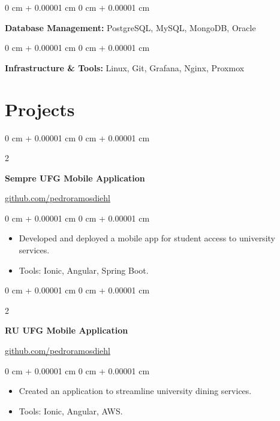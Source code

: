 \documentclass[10pt, letterpaper]{article}
\newenvironment{highlights}{
    \begin{itemize}[
        topsep=0.10 cm,
        parsep=0.10 cm,
        partopsep=0pt,
        itemsep=0pt,
        leftmargin=0 cm + 10pt
    ]
}{
    \end{itemize}
} %
\newenvironment{onecolentry}{
    \begin{adjustwidth}{
        0 cm + 0.00001 cm
    }{
        0 cm + 0.00001 cm
    }
}{
    \end{adjustwidth}
} %
\newenvironment{twocolentry}[2][]{
    \onecolentry
    \def\secondColumn{#2}
    \setcolumnwidth{\fill, 4.5 cm}
    \begin{paracol}{2}
}{
    \switchcolumn \raggedleft \secondColumn
    \end{paracol}
    \endonecolentry
} %
\begin{document}
        \vspace{0.10 cm}
        \begin{onecolentry}
            \textbf{Database Management:} PostgreSQL, MySQL, MongoDB, Oracle
        \end{onecolentry}

        \vspace{0.10 cm}
        \begin{onecolentry}
            \textbf{Infrastructure & Tools:} Linux, Git, Grafana, Nginx, Proxmox
        \end{onecolentry}

    \section{Projects}

        \begin{twocolentry}{
            \href{https://github.com/pedroramosdiehl}{github.com/pedroramosdiehl}
        }
            \textbf{Sempre UFG Mobile Application}
        \end{twocolentry}
        \vspace{0.10 cm}
        \begin{onecolentry}
            \begin{highlights}
                \item Developed and deployed a mobile app for student access to university services.
                \item Tools: Ionic, Angular, Spring Boot.
            \end{highlights}
        \end{onecolentry}

        \vspace{0.2 cm}

        \begin{twocolentry}{
            \href{https://github.com/pedroramosdiehl}{github.com/pedroramosdiehl}
        }
            \textbf{RU UFG Mobile Application}
        \end{twocolentry}
        \vspace{0.10 cm}
        \begin{onecolentry}
            \begin{highlights}
                \item Created an application to streamline university dining services.
                \item Tools: Ionic, Angular, AWS.
            \end{highlights}
        \end{onecolentry}
\end{document}
